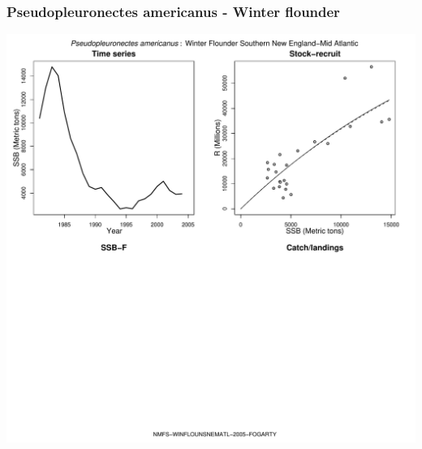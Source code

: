 \subsubsection{Pseudopleuronectes americanus - Winter flounder}
\begin{center}
\includegraphics[width=1.2\textwidth]{../R/figures/NMFS-WINFLOUNSNEMATL-2005-FOGARTY.pdf}
\end{center}

